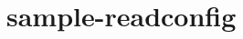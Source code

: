 \hypertarget{sample-readconfig-example}{
\section{sample-readconfig}
}


\begin{DocInclude}\begin{verbatim}\end{verbatim}
\end{DocInclude}
 
